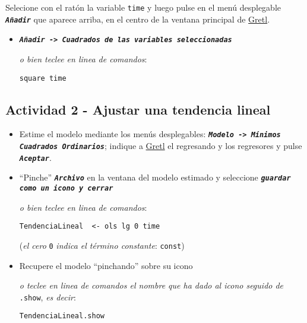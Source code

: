 \documentclass[11pt]{article}
\begin{document}
Selecione con el ratón la variable \texttt{time} y luego pulse en el menú desplegable \textbf{\emph{\texttt{Añadir}}} que aparece arriba, en el centro de la
ventana principal de \href{https://gretl.sourceforge.net/es.html}{Gretl}.
\begin{itemize}
\item \textbf{\emph{\texttt{Añadir -> Cuadrados de las variables seleccionadas}}}

{\vspace{0pt} \footnotesize \color{gray!70!black}
\emph{o bien teclee en linea de comandos}: 
\begin{verbatim}
square time
\end{verbatim}
}
\end{itemize}

\vspace{-3pt}

\subsection{Actividad 2 - Ajustar una tendencia lineal}
\label{sec:orga0706bf}
\begin{itemize}
\item Estime el modelo mediante los menús desplegables: \textbf{\emph{\texttt{Modelo ->
  Mínimos Cuadrados Ordinarios}}}; indique a \href{https://gretl.sourceforge.net/es.html}{Gretl} el regresando y los
regresores y pulse \textbf{\emph{\texttt{Aceptar}}}.

\item ``Pinche'' \textbf{\emph{\texttt{Archivo}}} en la ventana del modelo estimado y
seleccione \textbf{\emph{\texttt{guardar como un icono y cerrar}}}

{\vspace{1pt} \footnotesize \color{gray!70!black} \color{gray!70!black}
\emph{o bien teclee en linea de comandos}:
\begin{verbatim}
TendenciaLineal  <- ols lg 0 time
\end{verbatim}
(\emph{el cero} \texttt{0} \emph{indica el término constante}: \texttt{const})
}

\item Recupere el modelo ``pinchando'' sobre su icono

{\vspace{1pt} \footnotesize \color{gray!70!black} \color{gray!70!black}
\emph{o teclee en linea de comandos el nombre que ha dado al icono
seguido de} \texttt{.show}, \emph{es decir}:
\begin{verbatim}
TendenciaLineal.show
\end{verbatim}
}
\end{itemize}
\end{document}
